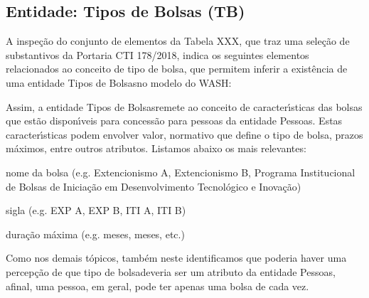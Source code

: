 \documentclass[
12pt,		%
openright,	%
twoside,  %
a4paper,			%
chapter=TITLE,		%
english,			%
french,				%
spanish,			%
brazil				%
]{USPSC-classe/USPSC}
\begin{document}
\subsection[Entidade: Tipos de Bolsas (TB)]{Entidade: Tipos de Bolsas (TB)}\label{Entidade: Tipos de Bolsas (TB)}
A inspe\c{c}\~ao do conjunto de elementos da Tabela XXX, que traz uma sele\c{c}\~ao de substantivos da Portaria CTI 178/2018, indica os seguintes elementos relacionados ao conceito de \textquotedbl tipo de bolsa\textquotedbl , que permitem inferir a exist\^encia de uma entidade \textquotedbl Tipos de Bolsas\textquotedbl  no modelo do WASH:











\noindent\begin{center}\mbox{\centering{}}\end{center}


Assim, a entidade \textquotedbl Tipos de Bolsas\textquotedbl  remete ao conceito de caracter\'{\i}sticas das bolsas que est\~ao dispon\'{\i}veis para concess\~ao para pessoas da entidade \textquotedbl Pessoas\textquotedbl . Estas caracter\'{\i}sticas podem envolver valor, normativo que define o tipo de bolsa, prazos m\'aximos, entre outros atributos. Listamos abaixo os mais relevantes:











\begin{alineas}
\item nome da bolsa (e.g. \textquotedbl Extencionismo A\textquotedbl , \textquotedbl Extencionismo B\textquotedbl , \textquotedbl Programa Institucional de Bolsas de Inicia\c{c}\~ao em Desenvolvimento Tecnol\'ogico e Inova\c{c}\~ao\textquotedbl )
\item sigla (e.g. EXP A, EXP B, ITI A, ITI B)
\item dura\c{c}\~ao m\'axima (e.g.  meses\textquotedbl ,  meses\textquotedbl , etc.)
\end{alineas}

Como nos demais t\'opicos, tamb\'em neste identificamos que poderia haver uma percep\c{c}\~ao de que \textquotedbl tipo de bolsa\textquotedbl  deveria ser um atributo da entidade \textquotedbl Pessoas\textquotedbl , afinal, uma pessoa, em geral, pode ter apenas uma bolsa de cada vez.
\end{document}
